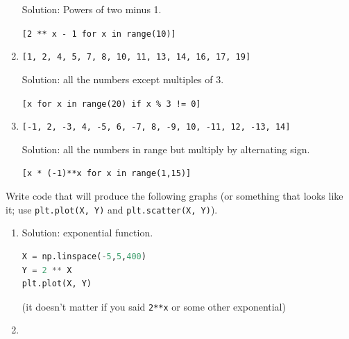 \documentclass[addpoints,12pt]{exam}
\newcommand{\code}[1]{{\texttt{#1}}}
\begin{document}
\begin{questions}
\begin{enumerate}
    \vspace{0.3in}
    Solution: Powers of two minus 1. 
    
    \code{[2 ** x - 1 for x in range(10)]}
    \vfill
  \item \code{[1, 2, 4, 5, 7, 8, 10, 11, 13, 14, 16, 17, 19]}

    \vspace{0.3in}
    Solution: all the numbers except multiples of 3. 
    
    \code{[x for x in range(20) if x \% 3 != 0]}
    \vfill
  \item \code{[-1, 2, -3, 4, -5, 6, -7, 8, -9, 10, -11, 12, -13, 14]}
    
    \vspace{0.3in}
    Solution: all the numbers in range but multiply by alternating sign. 
    
    \code{[x * (-1)**x for x in range(1,15)]}
    \vfill
\end{enumerate}


\newpage
\question[20] Write code that will produce the following graphs (or something that looks like it; use \code{plt.plot(X, Y)} and \code{plt.scatter(X, Y)}).
\begin{enumerate}
\item
{}
\vspace{0.2in}

Solution: exponential function. 
\begin{lstlisting}[language=python]
X = np.linspace(-5,5,400)
Y = 2 ** X
plt.plot(X, Y)
\end{lstlisting}
(it doesn't matter if you said \code{2**x} or some other exponential)
\vfill
\item 
{}


\end{enumerate}
\end{questions}
\end{document}
